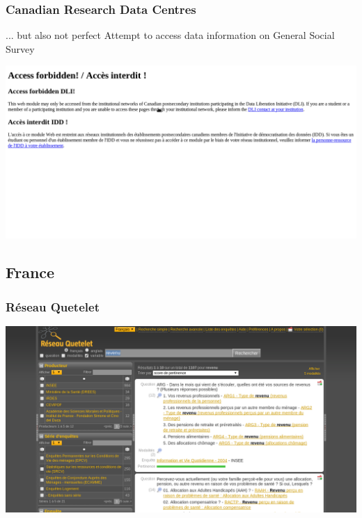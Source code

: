 \begin{frame}
\frametitle{Canadian Research Data Centres}
\begin{block}{... but also not perfect}
Attempt to access data information on General Social Survey
\end{block}
\includegraphics[width=\textwidth]{cdn-rdc-20130804-forbidden.png}
\end{frame}

\subsection{France}
\begin{frame}[label=France]
\frametitle{R\'eseau Quetelet}
\includegraphics[width=\textwidth]{quetelet-20130804.png}
\end{frame}

\begin{frame}
\frametitle{}
\tiny





\end{frame}
